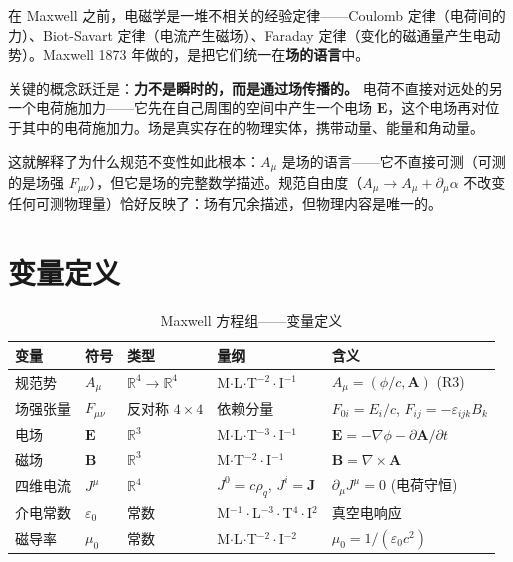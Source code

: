 在 Maxwell 之前，电磁学是一堆不相关的经验定律——Coulomb 定律（电荷间的力）、Biot-Savart 定律（电流产生磁场）、Faraday 定律（变化的磁通量产生电动势）。Maxwell 1873 年做的，是把它们统一在\textbf{场的语言}中。

关键的概念跃迁是：\textbf{力不是瞬时的，而是通过场传播的。} 电荷不直接对远处的另一个电荷施加力——它先在自己周围的空间中产生一个电场 $\mathbf{E}$，这个电场再对位于其中的电荷施加力。场是真实存在的物理实体，携带动量、能量和角动量。

这就解释了为什么规范不变性如此根本：$A_\mu$ 是场的语言——它不直接可测（可测的是场强 $F_{\mu\nu}$），但它是场的完整数学描述。规范自由度（$A_\mu \to A_\mu + \partial_\mu\alpha$ 不改变任何可测物理量）恰好反映了：场有冗余描述，但物理内容是唯一的。

\section{变量定义}

\begin{table}[h]
\centering\small
\begin{tabular}{p{2cm}p{1.5cm}p{2.2cm}p{2.2cm}p{3cm}}
\toprule
\textbf{变量} & \textbf{符号} & \textbf{类型} & \textbf{量纲} & \textbf{含义} \\
\midrule
规范势 & $A_\mu$ & $\mathbb{R}^4 \to \mathbb{R}^4$ & M$\cdot$L$\cdot$T$^{-2}\cdot$I$^{-1}$ & $A_\mu = (\phi/c, \mathbf{A})$ (R3) \\
场强张量 & $F_{\mu\nu}$ & 反对称 $4\times4$ & 依赖分量 & $F_{0i}=E_i/c$, $F_{ij}=-\varepsilon_{ijk}B_k$ \\
电场 & $\mathbf{E}$ & $\mathbb{R}^3$ & M$\cdot$L$\cdot$T$^{-3}\cdot$I$^{-1}$ & $\mathbf{E} = -\nabla\phi - \partial\mathbf{A}/\partial t$ \\
磁场 & $\mathbf{B}$ & $\mathbb{R}^3$ & M$\cdot$T$^{-2}\cdot$I$^{-1}$ & $\mathbf{B} = \nabla\times\mathbf{A}$ \\
四维电流 & $J^\mu$ & $\mathbb{R}^4$ & $J^0=c\rho_q$, $J^i=\mathbf{J}$ & $\partial_\mu J^\mu = 0$ (电荷守恒) \\
介电常数 & $\varepsilon_0$ & 常数 & M$^{-1}\cdot$L$^{-3}\cdot$T$^{4}\cdot$I$^{2}$ & 真空电响应 \\
磁导率 & $\mu_0$ & 常数 & M$\cdot$L$\cdot$T$^{-2}\cdot$I$^{-2}$ & $\mu_0 = 1/(\varepsilon_0 c^2)$ \\
\bottomrule
\end{tabular}
\caption{Maxwell 方程组——变量定义}
\end{table}

